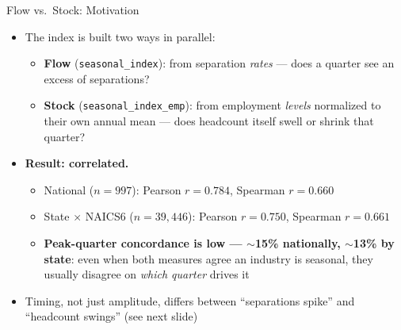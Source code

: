 \documentclass[aspectratio=169]{beamer}
\begin{document}
\begin{frame}{Flow vs.\ Stock: Motivation}
  \begin{itemize}
    \item The index is built two ways in parallel:
    \begin{itemize}
      \item \textbf{Flow} (\texttt{seasonal\_index}): from separation
            \emph{rates} --- does a quarter see an excess of separations?
      \item \textbf{Stock} (\texttt{seasonal\_index\_emp}): from employment
            \emph{levels} normalized to their own annual mean --- does
            headcount itself swell or shrink that quarter?
    \end{itemize}
    \bigskip
    \item \textbf{Result: correlated.}
    \begin{itemize}
      \item National ($n=997$): Pearson $r = 0.784$, Spearman $r = 0.660$
      \item State $\times$ NAICS6 ($n=39{,}446$): Pearson $r = 0.750$,
            Spearman $r = 0.661$
      \item \textbf{Peak-quarter concordance is low --- $\sim$15\%
            nationally, $\sim$13\% by state}: even when both measures agree
            an industry is seasonal, they usually disagree on \emph{which
            quarter} drives it
    \end{itemize}
    \item[$\to$] Timing, not just amplitude, differs between ``separations
          spike'' and ``headcount swings'' (see next slide)
  \end{itemize}
\end{frame}
\end{document}
